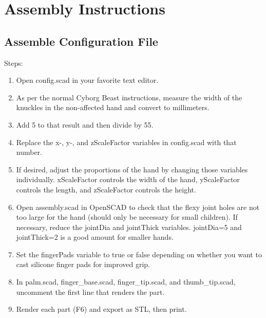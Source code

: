 \documentclass[11pt]{article}
\begin{document}
\newpage

\section{Assembly Instructions}

\subsection{Assemble Configuration File}Steps:
\begin{enumerate}
\item Open config.scad in your favorite text editor.
\item As per the normal Cyborg Beast instructions, measure the width of the knuckles in the non-affected hand and convert to millimeters.
\item Add 5 to that result and then divide by 55.
\item Replace the x-, y-, and zScaleFactor variables in config.scad with that number.
\item If desired, adjust the proportions of the hand by changing those variables individually. xScaleFactor controls the width of the hand, yScaleFactor controls the length, and zScaleFactor controls the height.
\item Open assembly.scad in OpenSCAD to check that the flexy joint holes are not too large for the hand (should only be necessary for small children). If necessary, reduce the jointDia and jointThick variables. jointDia=5 and jointThick=2 is a good amount for smaller hands.
\item Set the fingerPads variable to true or false depending on whether you want to cast silicone finger pads for improved grip.
\item In palm.scad, finger\_base.scad, finger\_tip.scad, and thumb\_tip.scad, uncomment the first line that renders the part.
\item Render each part (F6) and export as STL, then print.
\end{enumerate}
\end{document}
